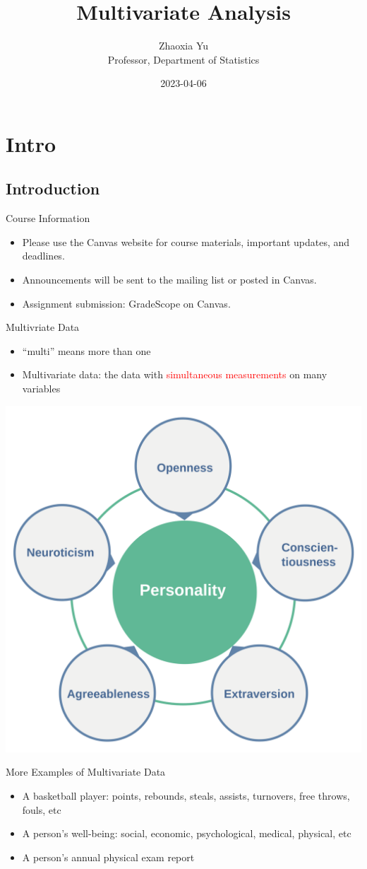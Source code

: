 \documentclass[
  ignorenonframetext,
]{beamer}
\title{Multivariate Analysis}
\author{Zhaoxia Yu\\
Professor, Department of Statistics}
\date{2023-04-06}
\providecommand{\tightlist}{%
  \setlength{\itemsep}{0pt}\setlength{\parskip}{0pt}}
\begin{document}
\frame{\titlepage}

\hypertarget{intro}{%
\section{Intro}\label{intro}}

\hypertarget{introduction}{%
\subsection{Introduction}\label{introduction}}

\begin{frame}{Course Information}
\protect\hypertarget{course-information}{}
\begin{itemize}
\tightlist
\item
  Please use the Canvas website for course materials, important updates,
  and deadlines.
\item
  Announcements will be sent to the mailing list or posted in Canvas.
\item
  Assignment submission: GradeScope on Canvas.
\end{itemize}
\end{frame}

\begin{frame}{Multivriate Data}
\protect\hypertarget{multivriate-data}{}
\begin{itemize}
\tightlist
\item
  ``multi'' means more than one
\item
  Multivariate data: the data with \textcolor{red}{simultaneous
  measurements} on many variables
\end{itemize}

\includegraphics[width=0.5\linewidth]{img/personality}
\end{frame}

\begin{frame}{More Examples of Multivariate Data}
\protect\hypertarget{more-examples-of-multivariate-data}{}
\begin{itemize}
\tightlist
\item
  A basketball player: points, rebounds, steals, assists, turnovers,
  free throws, fouls, etc
\item
  A person's well-being: social, economic, psychological, medical,
  physical, etc
\item
  A person's annual physical exam report
\end{itemize}
\end{frame}
\end{document}
